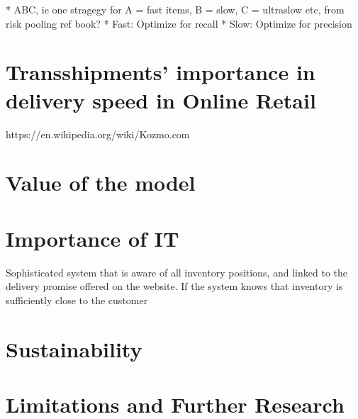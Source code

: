 \documentclass[../../main.tex]{subfiles}
\begin{document}
*	ABC, ie one stragegy for A = fast items, B = slow, C = ultraslow etc, from risk pooling ref book? 
  * Fast: Optimize for recall
  * Slow: Optimize for precision

\section{Transshipments' importance in delivery speed in Online Retail}
https://en.wikipedia.org/wiki/Kozmo.com

\section{Value of the model}

\section{Importance of IT}
Sophisticated system that is aware of all inventory positions, and linked to the delivery promise offered on the website. If the system knows that inventory is sufficiently close to the customer

\section{Sustainability}

\section{Limitations and Further Research}

\end{document}
